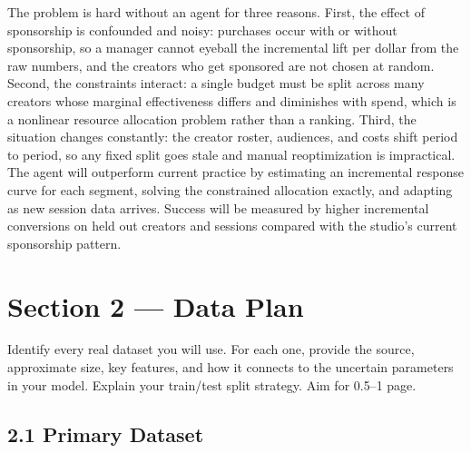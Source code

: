 \documentclass[11pt]{article}
\begin{document}
The problem is hard without an agent for three reasons. First, the effect of sponsorship is confounded and noisy: purchases occur with or without sponsorship, so a manager cannot eyeball the incremental lift per dollar from the raw numbers, and the creators who get sponsored are not chosen at random. Second, the constraints interact: a single budget must be split across many creators whose marginal effectiveness differs and diminishes with spend, which is a nonlinear resource allocation problem rather than a ranking. Third, the situation changes constantly: the creator roster, audiences, and costs shift period to period, so any fixed split goes stale and manual reoptimization is impractical. The agent will outperform current practice by estimating an incremental response curve for each segment, solving the constrained allocation exactly, and adapting as new session data arrives. Success will be measured by higher incremental conversions on held out creators and sessions compared with the studio's current sponsorship pattern.


\section{Section 2 — Data Plan}

\begin{hint}
  Identify every real dataset you will use. For each one, provide the source,
  approximate size, key features, and how it connects to the uncertain parameters
  in your model. Explain your train/test split strategy. Aim for 0.5--1 page.
\end{hint}


\subsection*{2.1 \; Primary Dataset}
\end{document}
